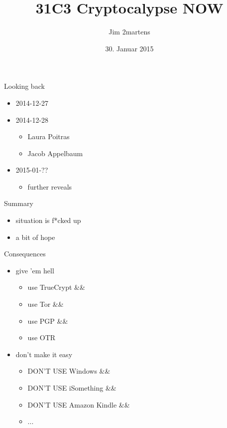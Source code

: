\documentclass{beamer}
\begin{document}
\author{Jim 2martens}
\title{31C3 Cryptocalypse NOW}
\date{30. Januar 2015}

	\begin{frame}
		\titlepage
	\end{frame}
	
	\begin{frame}{Looking back}
		\begin{itemize}
			\item 2014-12-27
			\item<2-> 2014-12-28
				\begin{itemize}
					\item Laura Poitras
					\item Jacob Appelbaum
				\end{itemize}
			\item<3-> 2015-01-??
				\begin{itemize}
					\item further reveals
				\end{itemize}
		\end{itemize}
	\end{frame}
	
	\begin{frame}{Summary}
		\begin{itemize}
			\item situation is f*cked up
			\item a bit of hope
		\end{itemize}
	\end{frame}
	
	\begin{frame}{Consequences}
		\begin{itemize}
			\item give 'em hell
			\begin{itemize}
				\item use TrueCrypt \&\&
				\item use Tor \&\&
				\item use PGP \&\&
				\item use OTR				
			\end{itemize}
			\item<2-> don't make it easy
			\begin{itemize}
				\item<3-> DON'T USE Windows \&\&
				\item<4-> DON'T USE iSomething \&\&
				\item<5-> DON'T USE Amazon Kindle \&\&
				\item<6-> ...
			\end{itemize}
		\end{itemize}
	\end{frame}
	
\end{document}
